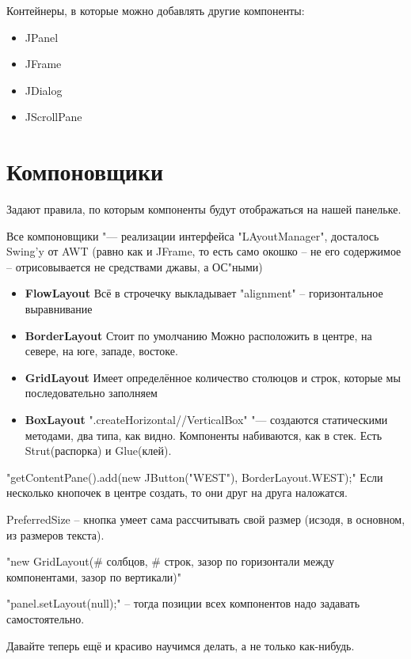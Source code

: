 Контейнеры, в которые можно добавлять другие компоненты:
\begin{itemize}
\item
	JPanel
\item
	JFrame
\item
	JDialog
\item
	JScrollPane
\end{itemize}


\section{Компоновщики}
Задают правила, по которым компоненты будут отображаться на нашей панельке.

Все компоновщики "--- реализации интерфейса "LAyoutManager", досталось Swing'y от AWT (равно как и JFrame, то есть само окошко -- не его содержимое -- отрисовывается не средствами джавы, а ОС"ными)

\begin{itemize}
\item
	\textbf{FlowLayout}
	Всё в строчечку выкладывает
	\java"alignment" -- горизонтальное выравнивание

\item
	\textbf{BorderLayout}
	Стоит по умолчанию
	Можно расположить в центре, на севере, на юге, западе, востоке.
\item
	\textbf{GridLayout}
	Имеет определённое количество столюцов и строк, которые мы последовательно заполняем
\item
	\textbf{BoxLayout}
	\java".createHorizontal//VerticalBox" "--- создаются статическими методами, два типа, как видно.
	Компоненты набиваются, как в стек.
	Есть Strut(распорка) и Glue(клей).
\end{itemize}

\java"getContentPane().add(new JButton("WEST"), BorderLayout.WEST);"
Если несколько кнопочек в центре создать, то они друг на друга наложатся.

PreferredSize -- кнопка умеет сама рассчитывать свой размер (исзодя, в основном, из размеров текста).

\java"new GridLayout(# солбцов, # строк, зазор по горизонтали между компонентами, зазор по вертикали)"


\java"panel.setLayout(null);" -- тогда позиции всех компонентов надо задавать самостоятельно.

Давайте теперь ещё и красиво научимся делать, а не только как-нибудь.
